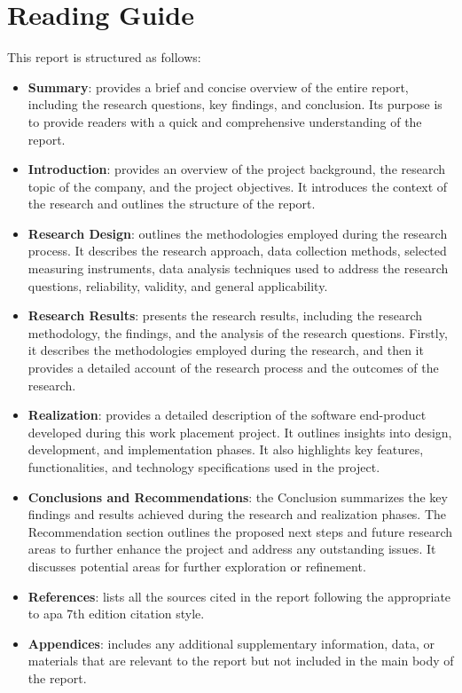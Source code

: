 \section{Reading Guide}
This report is structured as follows:
\begin{itemize}
      \item \textbf{Summary}: provides a brief and concise overview of the entire report, including the
            research questions, key findings, and conclusion. Its purpose is to provide readers with a
            quick and comprehensive understanding of the report.
      \item \textbf{Introduction}: provides an overview of the project background, the research topic of the
            company, and the project objectives. It introduces the context of the research and outlines the
            structure of the report.
      \item \textbf{Research Design}: outlines the methodologies employed during the research
            process. It describes the research approach, data collection methods, selected measuring instruments,
            data analysis techniques used to address the research questions, reliability, validity, and general
            applicability.
      \item \textbf{Research Results}: presents the research results, including the research methodology, the findings,
            and the analysis of the research questions. Firstly, it describes the methodologies employed
            during the research, and then it provides a detailed account of the research process and the
            outcomes of the research.
      \item \textbf{Realization}: provides a detailed description of the software end-product developed during
            this work placement project. It outlines insights into design, development, and implementation
            phases. It also highlights key features, functionalities, and technology specifications used in
            the project.
      \item \textbf{Conclusions and Recommendations}: the Conclusion summarizes the key findings and results
            achieved during the research and realization phases. The Recommendation section outlines the
            proposed next steps and future research areas to further enhance the project and address any
            outstanding issues. It discusses potential areas for further exploration or refinement.
      \item \textbf{References}: lists all the sources cited in the report following the appropriate to
            \acrshort{apa} 7th edition citation style.
      \item \textbf{Appendices}: includes any additional supplementary information, data, or materials that
            are relevant to the report but not included in the main body of the report.
\end{itemize}

